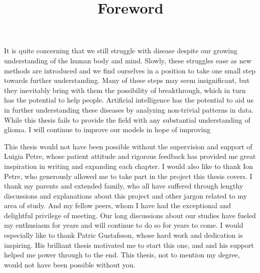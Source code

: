 \title{Foreword}

It is quite concerning that we still struggle with disease despite our growing understanding of the human body and mind. Slowly, these struggles ease as new methods are introduced and we find ourselves in a position to take one small step towards further understanding. Many of these steps may seem insignificant, but they inevitably bring with them the possibility of breakthrough, which in turn has the potential to help people. Artificial intelligence has the potential to aid us in further understanding these diseases by analyzing non-trivial patterns in data. While this thesis fails to provide the field with any substantial understanding of glioma. I will continue to improve our models in hope of improving

This thesis would not have been possible without the supervision and support of Luigia Petre, whose patient attitude and rigorous feedback has provided me great inspiration in writing and expanding each chapter. I would also like to thank Ion Petre, who generously allowed me to take part in the project this thesis covers. I thank my parents and extended family, who all have suffered through lengthy discussions and explanations about this project and other jargon related to my area of study. And my fellow peers, whom I have had the exceptional and delightful privilege of meeting. Our long discussions about our studies have fueled my enthusiasm for years and will continue to do so for years to come. I would especially like to thank Patric Gustafsson, whose hard work and dedication is inspiring. His brilliant thesis motivated me to start this one, and and his support helped me power through to the end. This thesis, not to mention my degree, would not have been possible without you.
